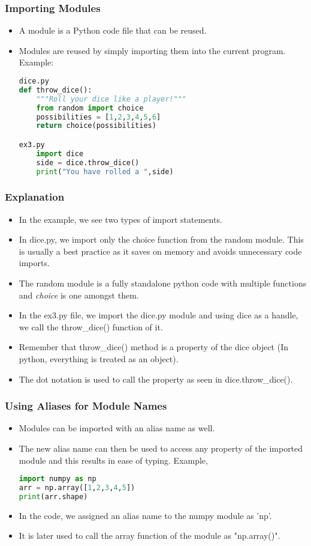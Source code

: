 \documentclass{beamer}
\begin{document}
\begin{frame}[fragile]
\frametitle{Importing Modules}
\begin{itemize}
\item A module is a Python code file that can be reused.
\item Modules are reused by simply importing them into the current program. Example:
\begin{lstlisting}[language=Python]
dice.py
def throw_dice():
	"""Roll your dice like a player!"""
	from random import choice
	possibilities = [1,2,3,4,5,6]
	return choice(possibilities)

ex3.py
	import dice
	side = dice.throw_dice()
	print("You have rolled a ",side)
\end{lstlisting}
\end{itemize}
\end{frame}

\begin{frame}[fragile]
\frametitle{Explanation}
\begin{itemize}
\item In the example, we see two types of import statements.
\item In dice.py, we import only the choice function from the random module. This is usually a best practice as it saves on memory and avoids unnecessary code imports.
\item The random module is a fully standalone python code  with multiple functions and \textit{choice} is one amongst them.
\item In the ex3.py file, we import the dice.py module and using dice as a handle, we call the throw\_dice() function of it.
\item Remember that throw\_dice() method is a property  of the dice object (In python, everything is treated as an object).
\item The dot notation is used to call the property as seen in dice.throw\_dice().
\end{itemize}
\end{frame}

\begin{frame}[fragile]
\frametitle{Using Aliases for Module Names}
\begin{itemize}
\item Modules can be imported with an alias name as well.
\item The new alias name can then be used to access any property of the imported module and this results in ease of typing.
Example,
\begin{lstlisting}[language=Python]
import numpy as np
arr = np.array([1,2,3,4,5])
print(arr.shape)
\end{lstlisting}
\item In the code, we assigned an alias name to the numpy module as 'np'.
\item It is later used to call the array function of the module as "np.array()".
\end{itemize}
\end{frame}
\end{document}
